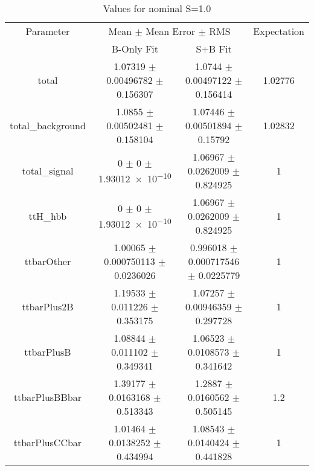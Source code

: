 \begin{table}
\centering
\caption{Values for nominal S=1.0}
\begin{tabular}{cccc}
\toprule
Parameter & \multicolumn{2}{c}{Mean $\pm$ Mean Error $\pm$ RMS} & Expectation\\
 & B-Only Fit & S+B Fit & \\
\midrule
total & \num{1.07319} $\pm$ \num{0.00496782} $\pm$ \num{0.156307} & \num{1.0744} $\pm$ \num{0.00497122} $\pm$ \num{0.156414} & \num{1.02776}\\
total\_background & \num{1.0855} $\pm$ \num{0.00502481} $\pm$ \num{0.158104} & \num{1.07446} $\pm$ \num{0.00501894} $\pm$ \num{0.15792} & \num{1.02832}\\
total\_signal & \num{0} $\pm$ \num{0} $\pm$ \num{1.93012e-10} & \num{1.06967} $\pm$ \num{0.0262009} $\pm$ \num{0.824925} & \num{1}\\
ttH\_hbb & \num{0} $\pm$ \num{0} $\pm$ \num{1.93012e-10} & \num{1.06967} $\pm$ \num{0.0262009} $\pm$ \num{0.824925} & \num{1}\\
ttbarOther & \num{1.00065} $\pm$ \num{0.000750113} $\pm$ \num{0.0236026} & \num{0.996018} $\pm$ \num{0.000717546} $\pm$ \num{0.0225779} & \num{1}\\
ttbarPlus2B & \num{1.19533} $\pm$ \num{0.011226} $\pm$ \num{0.353175} & \num{1.07257} $\pm$ \num{0.00946359} $\pm$ \num{0.297728} & \num{1}\\
ttbarPlusB & \num{1.08844} $\pm$ \num{0.011102} $\pm$ \num{0.349341} & \num{1.06523} $\pm$ \num{0.0108573} $\pm$ \num{0.341642} & \num{1}\\
ttbarPlusBBbar & \num{1.39177} $\pm$ \num{0.0163168} $\pm$ \num{0.513343} & \num{1.2887} $\pm$ \num{0.0160562} $\pm$ \num{0.505145} & \num{1.2}\\
ttbarPlusCCbar & \num{1.01464} $\pm$ \num{0.0138252} $\pm$ \num{0.434994} & \num{1.08543} $\pm$ \num{0.0140424} $\pm$ \num{0.441828} & \num{1}\\
\bottomrule
\end{tabular}
\end{table}